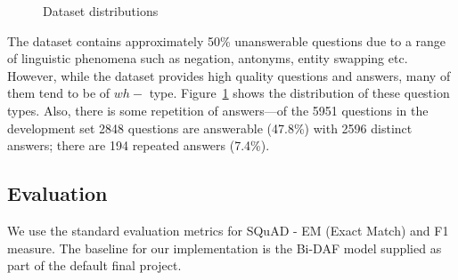 \documentclass{article}
\begin{document}
\begin{figure}[h]
  \vspace{-10pt}
  \centering
   \quad
   \quad
  \caption{Dataset distributions} 
  \label{dataset-distributions-figure}
\end{figure}

The dataset contains approximately 50\% unanswerable questions due to a range of linguistic phenomena such as negation, antonyms, entity swapping etc. However, while the dataset provides high quality questions and answers, many of them tend to be of $wh-$ type. Figure~\ref{dataset-distributions-figure} shows the distribution of these question types. Also, there is some repetition of answers—of the 5951 questions in the development set 2848 questions are answerable (47.8\%) with 2596 distinct answers; there are 194 repeated answers (7.4\%).

\subsection{Evaluation}
We use the standard evaluation metrics for SQuAD - EM (Exact Match) and F1 measure. The baseline for our implementation is the Bi-DAF model supplied as part of the default final project. 
\end{document}
